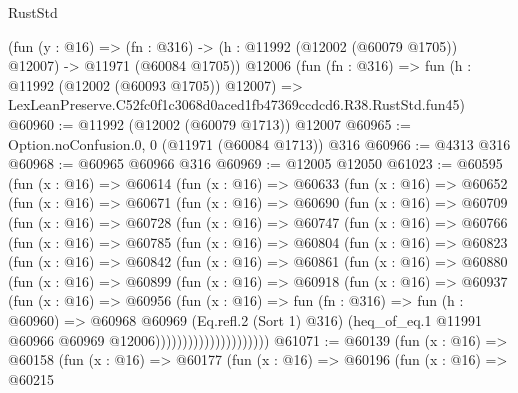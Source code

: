 \begin{lexlean}{RustStd}
\begin{coremodule}
    (fun (y : @16) =>
    (fn : @316) -> (h : @11992 (@12002 (@60079 @1705)) @12007) -> @11971 (@60084 @1705))
    @12006
    (fun (fn : @316) =>
    fun (h : @11992 (@12002 (@60093 @1705)) @12007) =>
    LexLeanPreserve.C52fc0f1c3068d0aced1fb47369ccdcd6.R38.RustStd.fun45)
@60960 := @11992 (@12002 (@60079 @1713)) @12007
@60965 := Option.noConfusion.{0, 0} (@11971 (@60084 @1713)) @316
@60966 := @4313 @316
@60968 := @60965 @60966 @316
@60969 := @12005 @12050
@61023 := @60595
    (fun (x : @16) =>
    @60614
      (fun (x : @16) =>
      @60633
        (fun (x : @16) =>
        @60652
          (fun (x : @16) =>
          @60671
            (fun (x : @16) =>
            @60690
              (fun (x : @16) =>
              @60709
                (fun (x : @16) =>
                @60728
                  (fun (x : @16) =>
                  @60747
                    (fun (x : @16) =>
                    @60766
                      (fun (x : @16) =>
                      @60785
                        (fun (x : @16) =>
                        @60804
                          (fun (x : @16) =>
                          @60823
                            (fun (x : @16) =>
                            @60842
                              (fun (x : @16) =>
                              @60861
                                (fun (x : @16) =>
                                @60880
                                  (fun (x : @16) =>
                                  @60899
                                    (fun (x : @16) =>
                                    @60918
                                      (fun (x : @16) =>
                                      @60937
                                        (fun (x : @16) =>
                                        @60956
                                          (fun (x : @16) =>
                                          fun (fn : @316) =>
                                          fun (h : @60960) =>
                                          @60968
                                            @60969
                                            (Eq.refl.{2} (Sort 1) @316)
                                            (heq_of_eq.{1}
                                              @11991
                                              @60966
                                              @60969
                                              @12006)))))))))))))))))))))
@61071 := @60139
    (fun (x : @16) =>
    @60158
      (fun (x : @16) =>
      @60177
        (fun (x : @16) =>
        @60196
          (fun (x : @16) =>
          @60215

\end{coremodule}
\end{lexlean}
